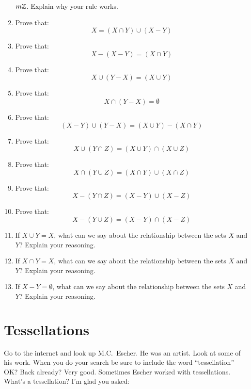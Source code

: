 \begin{problems}
\begin{enumerate}
  $m\mathbb Z$. Explain why your rule works.
\item Prove that:
\[
X = (X\cap Y) \cup (X-Y)
\]
\item Prove that:
\[
X-(X-Y) = (X\cap Y)
\]
\item Prove that:
\[
X \cup (Y-X) = (X\cup Y)
\]
\item Prove that:
\[
X \cap (Y-X) = \emptyset
\]
\item Prove that:
\[
(X-Y)\cup (Y-X) = (X\cup Y)-(X\cap Y)
\]
\item Prove that:
\[
X\cup (Y \cap Z) = (X \cup Y)\cap (X \cup Z)
\]
\item Prove that:
\[
X\cap (Y \cup Z) = (X \cap Y)\cup (X \cap Z)
\]
\item Prove that:
\[
X - (Y \cap Z) = (X -Y)\cup (X - Z)
\]
\item Prove that:
\[
X - (Y \cup Z) = (X -Y)\cap (X -Z)
\]
\item If $X\cup Y = X$, what can we say about the relationship between the sets $X$ and $Y$? Explain your reasoning.
\item If $X\cap Y = X$, what can we say about the relationship between the sets $X$ and $Y$? Explain your reasoning.
\item If $X-Y =\emptyset$, what can we say about the relationship between the sets $X$ and $Y$? Explain your reasoning.
\end{enumerate}
\end{problems}


\newpage



\section{Tessellations}

Go to the internet and look up M.C.\ Escher. He
was an artist. Look at some of his work. When you do your search be
sure to include the word ``tessellation'' OK? Back already? Very
good. Sometimes Escher worked with tessellations. What's a
tessellation? I'm glad you asked:

